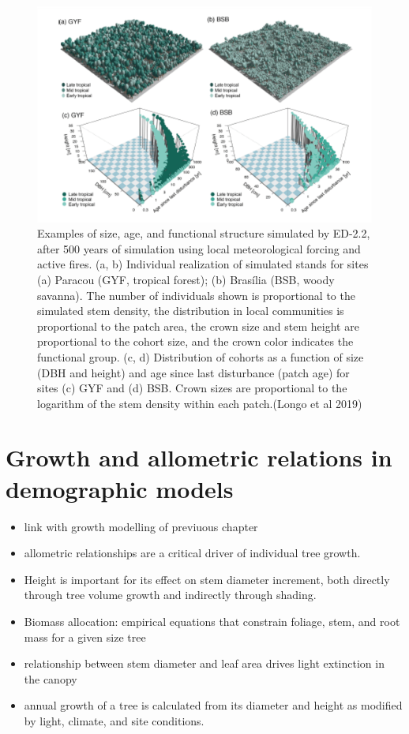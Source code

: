 \documentclass[
  12pt,
  oneside]{book}
\providecommand{\tightlist}{%
  \setlength{\itemsep}{0pt}\setlength{\parskip}{0pt}}
\begin{document}
\begin{figure}

{\centering \includegraphics[width=0.8\linewidth]{figures/chap6/f619_ED_amazon} 

}

\caption{ Examples of size, age, and functional structure simulated by ED-2.2, after 500 years of simulation using local meteorological forcing and active fires. (a, b) Individual realization of simulated stands for sites (a) Paracou (GYF, tropical forest); (b) Brasília (BSB, woody savanna). The number of individuals shown is proportional to the simulated stem density, the distribution in local communities is proportional to the patch area, the crown size and stem height are proportional to the cohort size, and the crown color indicates the functional group. (c, d) Distribution of cohorts as a function of size (DBH and height) and age since last disturbance (patch age) for sites (c) GYF and (d) BSB. Crown sizes are proportional to the logarithm of the stem density within each patch.(Longo et al 2019)}\label{fig:f619}
\end{figure}

\hypertarget{growth-and-allometric-relations-in-demographic-models}{%
\section{Growth and allometric relations in demographic models}\label{growth-and-allometric-relations-in-demographic-models}}

\begin{itemize}
\tightlist
\item
  link with growth modelling of previuous chapter
\item
  allometric relationships are a critical driver of individual tree growth.
\item
  Height is important for its effect on stem diameter increment, both directly through tree volume growth and indirectly through shading.
\item
  Biomass allocation: empirical equations that constrain foliage, stem, and root mass for a given size tree
\item
  relationship between stem diameter and leaf area drives light extinction in the canopy
\item
  annual growth of a tree is calculated from its diameter and height as modified by light, climate, and site conditions.
\end{itemize}
\end{document}
